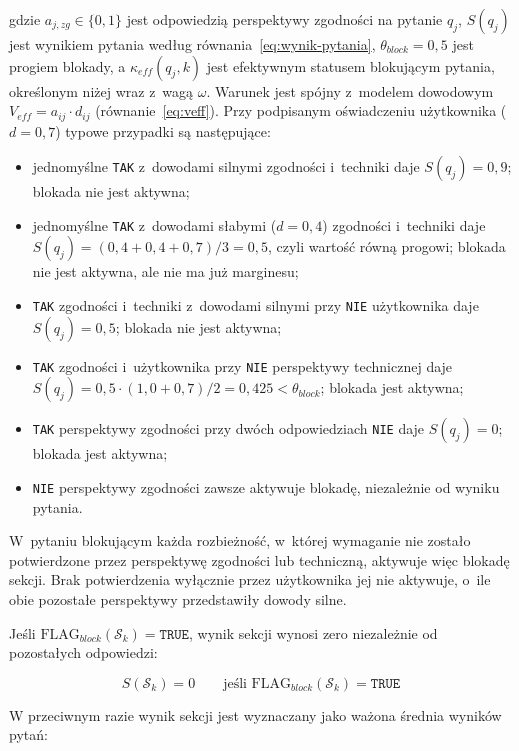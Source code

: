\noindent gdzie $a_{j,zg} \in \{0,1\}$ jest odpowiedzią perspektywy
zgodności na pytanie $q_j$, $S(q_j)$ jest wynikiem pytania według
równania~\eqref{eq:wynik-pytania}, $\theta_{block} = 0{,}5$
jest progiem blokady, a $\kappa_{eff}(q_j, k)$ jest efektywnym statusem
blokującym pytania, określonym niżej wraz z~wagą $\omega$.
Warunek jest spójny z~modelem dowodowym
$V_{eff} = a_{ij} \cdot d_{ij}$ (równanie~\eqref{eq:veff}).
Przy podpisanym oświadczeniu użytkownika ($d = 0{,}7$) typowe przypadki są następujące:
\begin{itemize}
  \item jednomyślne \texttt{TAK} z~dowodami silnymi zgodności i~techniki daje $S(q_j) = 0{,}9$; blokada nie jest aktywna;
  \item jednomyślne \texttt{TAK} z~dowodami słabymi ($d = 0{,}4$) zgodności i~techniki daje $S(q_j) = (0{,}4 + 0{,}4 + 0{,}7)/3 = 0{,}5$, czyli wartość równą progowi; blokada nie jest aktywna, ale nie ma już marginesu;
  \item \texttt{TAK} zgodności i~techniki z~dowodami silnymi przy \texttt{NIE} użytkownika daje $S(q_j) = 0{,}5$; blokada nie jest aktywna;
  \item \texttt{TAK} zgodności i~użytkownika przy \texttt{NIE} perspektywy technicznej daje $S(q_j) = 0{,}5 \cdot (1{,}0 + 0{,}7)/2 = 0{,}425 < \theta_{block}$; blokada jest aktywna;
  \item \texttt{TAK} perspektywy zgodności przy dwóch odpowiedziach \texttt{NIE} daje $S(q_j) = 0$; blokada jest aktywna;
  \item \texttt{NIE} perspektywy zgodności zawsze aktywuje blokadę, niezależnie od wyniku pytania.
\end{itemize}
W~pytaniu blokującym każda rozbieżność, w~której wymaganie nie zostało potwierdzone przez perspektywę zgodności lub techniczną, aktywuje więc blokadę sekcji. Brak potwierdzenia wyłącznie przez użytkownika jej nie aktywuje, o~ile obie pozostałe perspektywy przedstawiły dowody silne.

\noindent Jeśli $\text{FLAG}_{block}(\mathcal{S}_k) = \texttt{TRUE}$,
wynik sekcji wynosi zero niezależnie od pozostałych odpowiedzi:

\begin{equation}
S(\mathcal{S}_k) = 0
\qquad
\text{jeśli } \text{FLAG}_{block}(\mathcal{S}_k) = \texttt{TRUE}
\label{eq:wynik-sekcji-blok}
\end{equation}

\noindent W przeciwnym razie wynik sekcji jest wyznaczany
jako ważona średnia wyników pytań:

